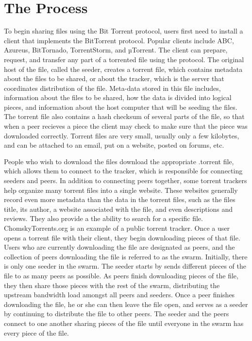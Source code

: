 \documentclass[a4paper,12pt]{report}
\begin{document}
\section{The Process}
To begin sharing files using the Bit Torrent protocol, users first need to install a client that implements the BitTorrent protocol.
Popular clients include ABC, Azureus, BitTornado, TorrentStorm, and µTorrent. The client can prepare, request, and transfer any part of a torrented file using the protocol.
The original host of the file, called the seeder, creates a torrent file, which contains metadata about the files to be shared, or about the tracker, which is the server that coordinates distribution of the file.
Meta-data stored in this file includes, information about the files to be shared, how the data is divided into logical pieces, and information about the host computer that will be seeding the files. The torrent file also contains a hash checksum of several parts of the file, so that when a peer recieves a piece the client may check to make sure that the piece was downloaded correctly.
Torrent files are very small, usually only a few kilobytes, and can be attached to an email, put on a website, posted on forums, etc.

People who wish to download the files download the appropriate .torrent file, which allows them to connect to the tracker, which is responsible for connecting seeders and peers.
In addition to connecting peers together, some torrent trackers help organize many torrent files into a single website. These websites generally record even more metadata than the data in the torrent files, such as the files title, its author, a website associated with the file, and even descriptions and reviews.
They also provide a the ability to search for a specific file. ChomskyTorrents.org is an example of a public torrent tracker.
Once a user opens a torrent file with their client, they begin downloading pieces of that file.
Users who are currently downloading the file are designated as peers, and the collection of peers downloading the file is referred to as the swarm.
Initially, there is only one seeder in the swarm.
The seeder starts by sends different pieces of the file to as many peers as possible. 
As peers finish downloading pieces of the file, they then share those pieces with the rest of the swarm, distributing the upstream bandwidth load amongst all peers and seeders. 
Once a peer finishes downloading the file, he or she can then leave the file open, and serves as a seeder by continuing to distribute the file to other peers.
The seeder and the peers connect to one another sharing pieces of the file until everyone in the swarm has every piece of the file.
\end{document}
